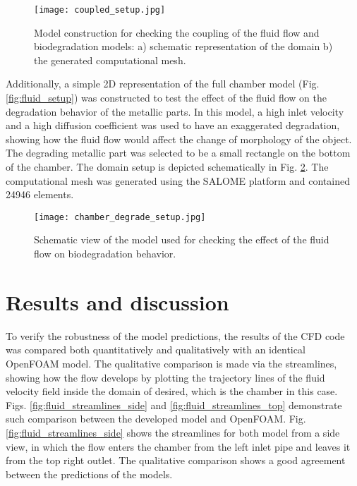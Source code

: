 \begin{figure}[h]
\centering
\medskip
\texttt{[image: coupled\_setup.jpg]}
\caption[Model construction for checking the coupling of the fluid flow and biodegradation models]{Model construction for checking the coupling of the fluid flow and biodegradation models: a) schematic representation of the domain b) the generated computational mesh.} \label{fig:fluid_coupled_setup}
\end{figure}

Additionally, a simple 2D representation of the full chamber model (Fig. \ref{fig:fluid_setup}) was constructed to test the effect of the fluid flow on the degradation behavior of the metallic parts. In this model, a high inlet velocity and a high diffusion coefficient was used to have an exaggerated degradation, showing how the fluid flow would affect the change of morphology of the object. The degrading metallic part was selected to be a small rectangle on the bottom of the chamber. The domain setup is depicted schematically in Fig. \ref{fig:fluid_chamber_degrade_setup}. The computational mesh was generated using the SALOME platform and contained \num{24946} elements.

\begin{figure}[h]
\centering
\medskip
\texttt{[image: chamber\_degrade\_setup.jpg]}
\caption[Schematic view of the model for checking the effect of fluid flow on biodegradation behavior]{Schematic view of the model used for checking the effect of the fluid flow on biodegradation behavior.} \label{fig:fluid_chamber_degrade_setup}
\end{figure}

\section{Results and discussion}

To verify the robustness of the model predictions, the results of the CFD code was compared both quantitatively and qualitatively with an identical  OpenFOAM model. The qualitative comparison is made via the streamlines, showing how the flow develops by plotting the trajectory lines of the fluid velocity field inside the domain of desired, which is the chamber in this case. Figs. \ref{fig:fluid_streamlines_side} and \ref{fig:fluid_streamlines_top} demonstrate such comparison between the developed model and OpenFOAM. Fig. \ref{fig:fluid_streamlines_side} shows the streamlines for both model from a side view, in which the flow enters the chamber from the left inlet pipe and leaves it from the top right outlet. The qualitative comparison shows a good agreement between the predictions of the models. 

